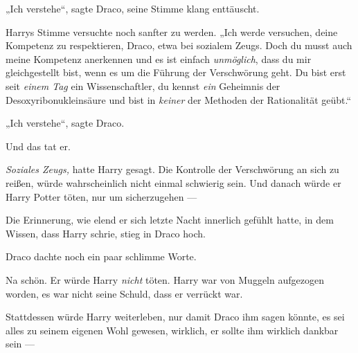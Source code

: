 „Ich verstehe“, sagte Draco, seine Stimme klang enttäuscht.

Harrys Stimme versuchte noch sanfter zu werden.
„Ich werde versuchen, deine Kompetenz zu respektieren, Draco, etwa bei sozialem Zeugs. Doch du musst auch meine Kompetenz anerkennen und es ist einfach \emph{unmöglich}, dass du mir gleichgestellt bist, wenn es um die Führung der Verschwörung geht. Du bist erst seit \emph{einem Tag} ein Wissenschaftler, du kennst \emph{ein} Geheimnis der Desoxyribonukleinsäure und bist in \emph{keiner} der Methoden der Rationalität geübt.“

„Ich verstehe“, sagte Draco.

Und das tat er.

\emph{Soziales Zeugs,} hatte Harry gesagt. Die Kontrolle der Verschwörung an sich zu reißen, würde wahrscheinlich nicht einmal schwierig sein. Und danach würde er Harry Potter töten, nur um sicherzugehen —

Die Erinnerung, wie elend er sich letzte Nacht innerlich gefühlt hatte, in dem Wissen, dass Harry schrie, stieg in Draco hoch.

Draco dachte noch ein paar schlimme Worte.

Na schön. Er würde Harry \emph{nicht} töten. Harry war von Muggeln aufgezogen worden, es war nicht seine Schuld, dass er verrückt war.

Stattdessen würde Harry weiterleben, nur damit Draco ihm sagen könnte, es sei alles zu seinem eigenen Wohl gewesen, wirklich, er sollte ihm wirklich dankbar sein —

